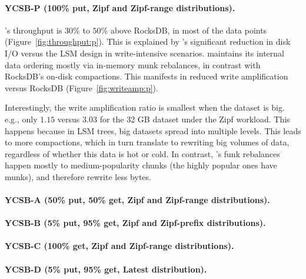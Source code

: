 \paragraph{YCSB-P (100\% put, Zipf and Zipf-range distributions).} 
\sys's throughput is $30\%$ to $50\%$ above RocksDB, in most of the data points (Figure~\ref{fig:throughput:p}). 
This is explained by \sys's significant reduction in disk I/O versus the LSM design in write-intensive scenarios. 
\sys\/ maintains its internal data ordering mostly via in-memory munk rebalances, in contrast with RocksDB's 
on-disk compactions. This manifests in reduced write amplification versus RocksDB (Figure~\ref{fig:writeamp:p}). 

Interestingly, the write amplification ratio is smallest when the dataset is big. 
e.g., only $1.15$ versus $3.03$ for the 32 GB dataset under the Zipf workload. 
This happens because in LSM  trees, big datasets spread into multiple levels. 
This leads to more compactions, which in turn translate to rewriting big volumes of data, 
regardless of whether this data is hot or cold. In contrast, \sys's funk rebalances 
happen mostly to medium-popularity chunks (the highly popular ones have munks), 
and therefore rewrite less bytes.  

\paragraph{YCSB-A (50\% put, 50\% get, Zipf and Zipf-range distributions).}

\paragraph{YCSB-B (5\% put, 95\% get, Zipf and Zipf-prefix distributions).}

\paragraph{YCSB-C (100\% get, Zipf and Zipf-range distributions).}  

\paragraph{YCSB-D (5\% put, 95\% get, Latest distribution).}

